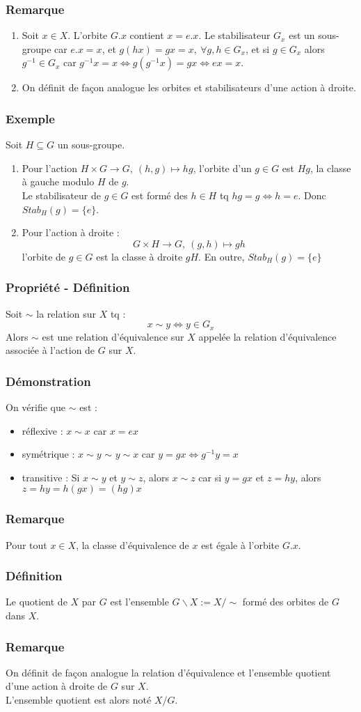 \documentclass[a4paper, oneside]{report}
\newcommand{\x}{\times}
\newcommand{\defi}{\subsubsection{Définition}}
\newcommand{\dem}{\subsubsection{Démonstration}}
\newcommand{\remar}{\subsubsection{Remarque}}
\newcommand{\exem}{\subsubsection{Exemple}}
\begin{document}
\remar
\begin{enumerate}
\item Soit $x\in X$. L'orbite $G.x$ contient $x=e.x$. Le stabilisateur $G_x$ est un sous-groupe car $e.x=x$, et $g(hx)=gx=x,~\forall g,h\in G_x$, et si $g\in G_x$ alors $g^{-1}\in G_x$ car $g^{-1}x = x \Leftrightarrow g(g^{-1}x)=gx \Leftrightarrow ex = x$.
\item On définit de façon analogue les orbites et stabilisateurs d'une action à droite.
\end{enumerate}

\exem 
Soit $H\subseteq G$ un sous-groupe.
\begin{enumerate}
\item Pour l'action $H\x G \rightarrow G,~(h,g)\mapsto hg$, l'orbite d'un $g\in G$ est $Hg$, la classe à gauche modulo $H$ de $g$.\\
Le stabilisateur de $g\in G$ est formé des $h\in H$ tq $hg=g \Leftrightarrow h=e$. Donc $Stab_H(g)=\{e\}$.\\
\item Pour l'action à droite :
$$G\x H \rightarrow G,~(g,h)\mapsto gh$$
l'orbite de $g\in G$ est la classe à droite $gH$. En outre, $Stab_H(g)=\{e\}$
\end{enumerate}

\subsubsection{Propriété - Définition}
Soit $\sim$ la relation sur $X$ tq :
$$x\sim y \Leftrightarrow y\in G_x$$
Alors $\sim$ est une relation d'équivalence sur $X$ appelée la relation d'équivalence associée à l'action de $G$ sur $X$.

\dem
On vérifie que $\sim$ est :
\begin{itemize}
\item réflexive : $x\sim x$ car $x=ex$
\item symétrique : $x\sim y$ $\sim$ $y\sim x$ car $y=gx\Leftrightarrow g^{-1}y=x$
\item transitive : Si $x\sim y$ et $y\sim z$, alors $x\sim z$ car si $y=gx$ et $z=hy$, alors $z=hy=h(gx)=(hg)x$
\end{itemize}

\remar
Pour tout $x\in X$, la classe d'équivalence de $x$ est égale à l'orbite $G.x$.

\defi 
Le quotient de $X$ par $G$ est l'ensemble $G\backslash X := X/\sim$ formé des orbites de $G$ dans $X$.

\remar
On définit de façon analogue la relation d'équivalence et l'ensemble quotient d'une action à droite de $G$ sur $X$.\\
L'ensemble quotient est alors noté $X/G$.
\end{document}
